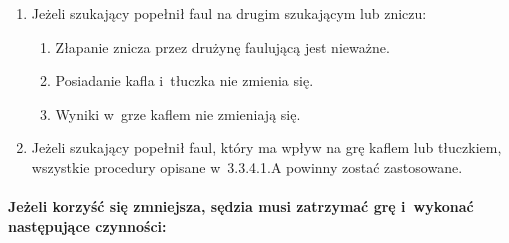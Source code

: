 \documentclass[12pt,a4paper]{article}
\begin{document}
\begin{enumerate}
	      \begin{enumerate}
		      \item
		            Jeżeli szukający popełnił faul na drugim szukającym lub zniczu:

		            \begin{enumerate}
			            \item
			                  Złapanie znicza przez drużynę faulującą jest nieważne.
			            \item
			                  Posiadanie kafla i~tłuczka nie zmienia się.
			            \item
			                  Wyniki w~grze kaflem nie zmieniają się.
		            \end{enumerate}
		      \item
		            Jeżeli szukający popełnił faul, który ma wpływ na grę kaflem lub
		            tłuczkiem, wszystkie procedury opisane w~3.3.4.1.A powinny zostać
		            zastosowane.
	      \end{enumerate}
\end{enumerate}

\paragraph{Jeżeli korzyść się zmniejsza, sędzia musi
	zatrzymać grę i~wykonać następujące czynności:}
\end{document}
